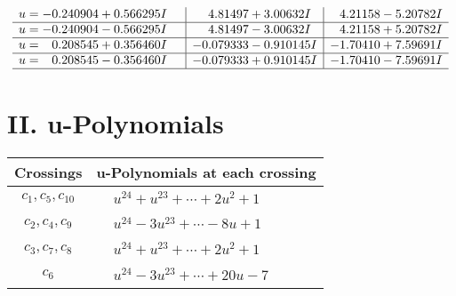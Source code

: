 \documentclass[1p]{elsarticle_modified}
\theoremstyle{definition}
\begin{document}
$$\begin{array}{c|c|c}
\begin{aligned}
u &= -0.240904 + 0.566295 I\end{aligned}
 & \phantom{-}4.81497 + 3.00632 I & \phantom{-}4.21158 - 5.20782 I \\ \hline\begin{aligned}
u &= -0.240904 - 0.566295 I\end{aligned}
 & \phantom{-}4.81497 - 3.00632 I & \phantom{-}4.21158 + 5.20782 I \\ \hline\begin{aligned}
u &= \phantom{-}0.208545 + 0.356460 I\end{aligned}
 & -0.079333 - 0.910145 I & -1.70410 + 7.59691 I \\ \hline\begin{aligned}
u &= \phantom{-}0.208545 - 0.356460 I\end{aligned}
 & -0.079333 + 0.910145 I & -1.70410 - 7.59691 I\\
 \hline 
 \end{array}$$\newpage
\newpage\renewcommand{\arraystretch}{1}
\centering \section*{ II. u-Polynomials}
\begin{tabular}{m{50pt}|m{274pt}}
Crossings & \hspace{64pt}u-Polynomials at each crossing \\
\hline $$\begin{aligned}c_{1},c_{5},c_{10}\end{aligned}$$&$\begin{aligned}
&u^{24}+u^{23}+\cdots+2 u^2+1
\end{aligned}$\\
\hline $$\begin{aligned}c_{2},c_{4},c_{9}\end{aligned}$$&$\begin{aligned}
&u^{24}-3 u^{23}+\cdots-8 u+1
\end{aligned}$\\
\hline $$\begin{aligned}c_{3},c_{7},c_{8}\end{aligned}$$&$\begin{aligned}
&u^{24}+u^{23}+\cdots+2 u^2+1
\end{aligned}$\\
\hline $$\begin{aligned}c_{6}\end{aligned}$$&$\begin{aligned}
&u^{24}-3 u^{23}+\cdots+20 u-7
\end{aligned}$\\
\hline
\end{tabular}\newpage\renewcommand{\arraystretch}{1}
\end{document}
